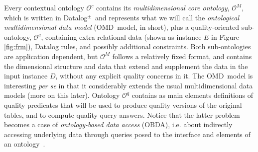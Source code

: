 \documentclass[format=acmsmall, review=false, screen=true]{acmart}
\newcommand{\mc}[1]{\mathcal{ #1}}
\newcommand{\dpm}{{Datalog}$^\pm$}
\newcommand{\omd}{OMD}
\begin{document}
Every contextual ontology $\mc{O}^c$ contains its {\em multidimensional core ontology}, $\mc{O}^M$, which is written in \dpm \ and represents what we will call the {\em ontological multidimensional data model} (\omd \ model, in short), plus a quality-oriented sub-ontology, $\mc{O}^q$, containing extra relational data (shown as instance $E$ in Figure \ref{fig:frm}), Datalog  rules, and possibly additional constraints.  Both sub-ontologies are application dependent, but
$\mc{O}^M$ follows a relatively fixed format, and contains the dimensional structure and data that extend and supplement the data in the input instance $D$, without any explicit quality concerns in it. The \omd \ model is interesting {\em per se} in that it considerably extends the usual multidimensional data models (more on this later). Ontology $\mc{O}^q$ contains as main elements definitions of quality predicates that will be used to produce quality versions of the original tables, and to compute quality query answers.  Notice that the latter problem becomes a case  of
{\em ontology-based data access} (OBDA), i.e. about indirectly accessing underlying data through queries posed to the interface and elements of an ontology~\cite{poggi}.

\vspace{-2mm}
\end{document}
